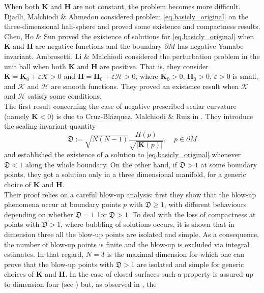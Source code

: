 \documentclass[11pt,a4paper]{amsart}
\begin{document}
When both $\mathbf{K}$ and $\mathbf{H}$ are not constant, the problem becomes more difficult. Djadli, Malchiodi \& Ahmedou \cite{DjadliMalchiodiOuldAhmedou_2003} considered problem \eqref{eq.basicly_original} on the three-dimensional half-sphere and proved some existence and compactness results. Chen, Ho \& Sun \cite{ChenHoSun_2018} proved the existence of solutions for \eqref{eq.basicly_original} when $\mathbf{K}$ and $\mathbf{H}$ are negative functions and the boundary $\partial M$ has negative Yamabe invariant.
Ambrosetti, Li \& Malchiodi \cite{AmbrosettiLiMalchiodi_2002} considered the perturbation problem in the unit ball when both $\mathbf{K}$ and $\mathbf{H}$ are positive. That is, they consider $\mathbf{K} = \mathbf{K}_0 + \varepsilon \mathcal{K} > 0$ and $\mathbf{H} = \mathbf{H}_0 + \varepsilon \mathcal{H} > 0$, where $\mathbf{K}_0 > 0$, $\mathbf{H}_0 > 0$, $\varepsilon > 0$ is small, and $\mathcal{K}$ and $\mathcal{H}$ are smooth functions. They proved an existence result when $\mathcal{K}$ and $\mathcal{H}$ satisfy some conditions.\\
The first result concerning the case of negative prescribed scalar curvature (namely $\mathbf{K}<0$) is due to Cruz-Bl\'azquez, Malchiodi \& Ruiz in \cite{CruzMalchiodiRuiz}. They introduce the scaling invariant
quantity $$\mathfrak D:=\sqrt{N(N-1)}\frac{H(p)}{\sqrt{|\mathbf K(p)|}},\quad p\in\partial M$$ and established the existence of a solution to \eqref{eq.basicly_original} whenever $\mathfrak D<1$ along the whole boundary. On the other hand, if $\mathfrak D>1$ at some boundary points, they got a solution only in a three dimensional manifold, for a generic choice of $\mathbf K$ and $\mathbf H$.\\ Their proof relies on a careful blow-up analysis: first they show that the blow-up phenomena occur
at boundary points $p$ with $\mathfrak D\geq1$, with different behaviours depending on whether $\mathfrak D=1$ 1or $\mathfrak D>1$. To deal with the loss of compactness at points with $\mathfrak D>1$, where bubbling of solutions occurs, it is shown that in dimension three all the blow-up points are isolated and simple. As a consequence, the number of blow-up points is finite and the blow-up is excluded via integral estimates. In that regard, $N= 3$ is the maximal dimension for which one
can prove that the blow-up points with $\mathfrak D>1$ are isolated and simple for generic choices of $\mathbf K$ and $\mathbf H$. In the case of closed surfaces such a property is assured up to dimension four (see \cite{Li_1996}) but, as observed in \cite{DjadliMalchiodiOuldAhmedou_2003}, the
\end{document}
